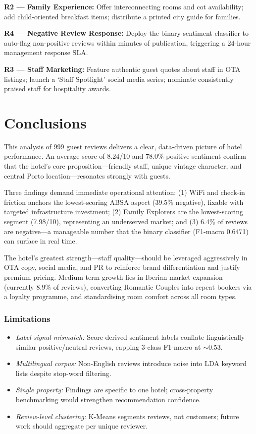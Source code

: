 \documentclass[runningheads]{llncs}
\begin{document}
\textbf{R2 --- Family Experience:} Offer interconnecting rooms and cot
availability; add child-oriented breakfast items; distribute a printed
city guide for families.

\textbf{R4 --- Negative Review Response:} Deploy the binary sentiment
classifier to auto-flag non-positive reviews within minutes of
publication, triggering a 24-hour management response SLA.

\textbf{R3 --- Staff Marketing:} Feature authentic guest quotes about
staff in OTA listings; launch a `Staff Spotlight' social media series;
nominate consistently praised staff for hospitality awards.

\section{Conclusions}

This analysis of 999 guest reviews delivers a clear, data-driven picture
of hotel performance. An average score of 8.24/10 and 78.0\% positive
sentiment confirm that the hotel's core proposition---friendly staff,
unique vintage character, and central Porto location---resonates strongly
with guests.

Three findings demand immediate operational attention: (1) WiFi and
check-in friction anchors the lowest-scoring ABSA aspect (39.5\%
negative), fixable with targeted infrastructure investment; (2) Family
Explorers are the lowest-scoring segment (7.98/10), representing an
underserved market; and (3) 6.4\% of reviews are negative---a
manageable number that the binary classifier (F1-macro 0.6471) can
surface in real time.

The hotel's greatest strength---staff quality---should be leveraged
aggressively in OTA copy, social media, and PR to reinforce brand
differentiation and justify premium pricing. Medium-term growth lies in
Iberian market expansion (currently 8.9\% of reviews), converting
Romantic Couples into repeat bookers via a loyalty programme, and
standardising room comfort across all room types.

\subsubsection*{Limitations}
\begin{itemize}
  \item \textit{Label-signal mismatch:} Score-derived sentiment labels
    conflate linguistically similar positive/neutral reviews, capping
    3-class F1-macro at ${\sim}0.53$.
  \item \textit{Multilingual corpus:} Non-English reviews introduce
    noise into LDA keyword lists despite stop-word filtering.
  \item \textit{Single property:} Findings are specific to one hotel;
    cross-property benchmarking would strengthen recommendation
    confidence.
  \item \textit{Review-level clustering:} K-Means segments reviews, not
    customers; future work should aggregate per unique reviewer.
\end{itemize}
\end{document}
